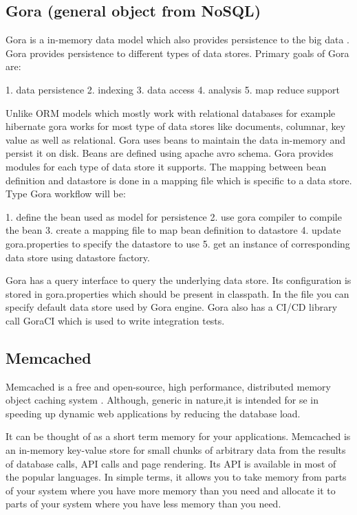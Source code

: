 \subsection{Gora (general object from NoSQL)}

     Gora is a in-memory data model which also
     provides persistence to the big data \cite{www-gora}.
     Gora provides persistence
     to different types of data stores. Primary goals of Gora are:

     1. data persistence
     2. indexing
     3. data access
     4. analysis
     5. map reduce support

     Unlike ORM models which mostly work with relational databases for
     example hibernate gora works for most type of data stores like
     documents, columnar, key value as well as relational. Gora uses
     beans to maintain the data in-memory and persist it on
     disk. Beans are defined using apache avro schema. Gora provides
     modules for each type of data store it supports.  The mapping
     between bean definition and datastore is done in a mapping file
     which is specific to a data store.  Type Gora workflow will be:

     1. define  the bean used as model for persistence
     2. use gora compiler to compile the bean
     3. create a mapping file to map bean definition to datastore
     4. update gora.properties to specify the datastore to use
     5. get an instance of corresponding data store using datastore factory.

     Gora has a query interface to query the underlying data
     store. Its configuration is stored in gora.properties which
     should be present in classpath. In the file you can specify
     default data store used by Gora engine. Gora also has a CI/CD
     library call GoraCI which is used to write integration tests.

     \pv

\subsection{Memcached}

     Memcached is a free and open-source, high performance,
     distributed memory object caching system \cite{www-memcached}.
     Although, generic in nature,it is intended for se in speeding up
     dynamic web applications by reducing the database load.

     It can be thought of as a short term memory for your
     applications.  Memcached is an in-memory key-value store for
     small chunks of arbitrary data from the results of database
     calls, API calls and page rendering. Its API is available in most
     of the popular languages. In simple terms, it allows you to take
     memory from parts of your system where you have more memory than
     you need and allocate it to parts of your system where you have
     less memory than you need.

